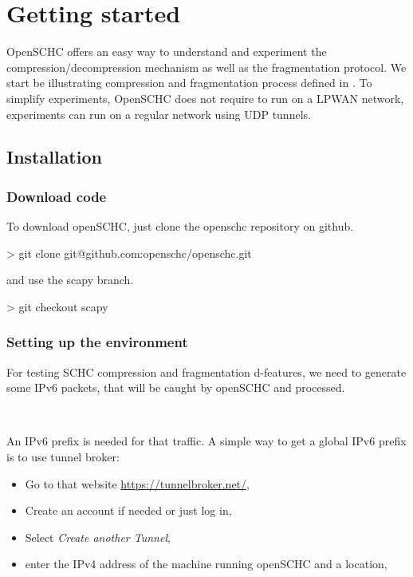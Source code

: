\chapter{Getting started}

OpenSCHC offers an easy way to understand and experiment the compression/decompression mechanism as well as the fragmentation protocol. We start be illustrating compression and fragmentation process defined in . To simplify experiments, OpenSCHC does not require to run on a LPWAN network, experiments can run on a regular network using UDP tunnels.


\section{Installation}\label{chap-plat}

\subsection{Download code}

To download openSCHC, just clone the openschc repository on github.


\begin{termc}[backgroundcolor=\color{palerod}, basicstyle=\ttfamily\small]
> git clone git@github.com:openschc/openschc.git
\end{termc}

and use the scapy branch.

\begin{termc}[backgroundcolor=\color{palerod}, basicstyle=\ttfamily\small, escapechar=@]
> git checkout scapy
\end{termc}

\subsection{Setting up the environment}

For testing SCHC compression and fragmentation d-features, we need to generate some IPv6 packets, that will be caught by openSCHC and processed. 

~

An IPv6 prefix is needed for that traffic. A simple way to get a global IPv6 prefix is to use  tunnel broker:
\begin{itemize}
\item Go to that website \url{https://tunnelbroker.net/}, 
\item Create an account if needed or just log in, 
\item Select \textit{Create another Tunnel},
\item enter the IPv4 address of the machine running openSCHC and a location,
\end{itemize}

